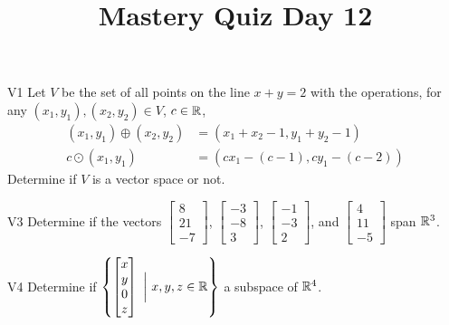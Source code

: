 \documentclass{sbgLAquiz}
\title{Mastery Quiz Day 12 }
\begin{document}
\begin{problem}{V1}
Let $V$ be the set of all points on the line $x+y=2$ with the operations, for any $(x_1,y_1), (x_2,y_2) \in V$, $c \in \mathbb{R}$,
\begin{align*}
(x_1,y_1) \oplus (x_2,y_2) &= (x_1+x_2-1,y_1+y_2-1) \\
c \odot (x_1,y_1) &= (cx_1-(c-1), cy_1-(c-2))
\end{align*}
Determine if $V$ is a vector space or not.
\end{problem}

\begin{problem}{V3}
Determine if the vectors  $\begin{bmatrix} 8 \\ 21 \\ -7 \end{bmatrix}$, $\begin{bmatrix} -3 \\ -8 \\ 3 \end{bmatrix}$, $\begin{bmatrix} -1 \\ -3 \\ 2 \end{bmatrix}$, and $\begin{bmatrix} 4 \\ 11 \\ -5 \end{bmatrix}$ span $\mathbb{R}^3$.
\end{problem}
\newpage

\begin{problem}{V4}
Determine if $\left\{ \begin{bmatrix} x \\ y \\ 0 \\ z \end{bmatrix}\  \bigg|\ x,y,z \in \mathbb{R}\right\}$  a subspace of $\mathbb{R}^4$.
\end{problem}
\end{document}
